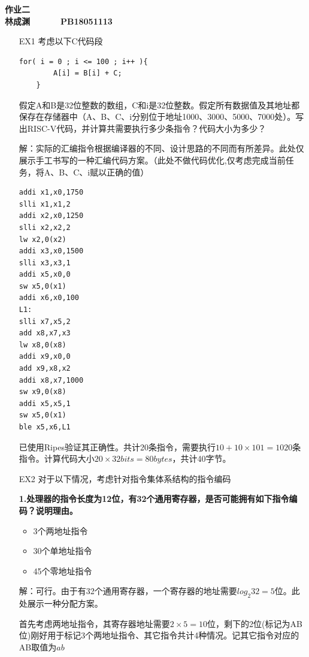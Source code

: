 \documentclass[12pt,a4paper,utf8]{ctexart}
\begin{document}


\begin{center}
\textbf{作业二}\\
\textbf{林成渊 ~~~~~ PB18051113 ~~~~~ \zhtoday}\\
\end{center}
\textit{}
\vspace{\baselineskip}

\begin{enumerate}
\item[EX1] %
考虑以下C代码段
\begin{lstlisting}[frame=single]
	for( i = 0 ; i <= 100 ; i++ ){
		A[i] = B[i] + C;
	}
\end{lstlisting}
假定A和B是32位整数的数组，C和i是32位整数。假定所有数据值及其地址都保存在存储器中（A、B、C、i分别位于地址1000、3000、5000、7000处）。写出RISC-V代码，并计算共需要执行多少条指令？代码大小为多少？

解：实际的汇编指令根据编译器的不同、设计思路的不同而有所差异。此处仅展示手工书写的一种汇编代码方案。（此处不做代码优化,仅考虑完成当前任务，将A、B、C、i赋以正确的值）
\begin{lstlisting}[frame=single]
addi x1,x0,1750
slli x1,x1,2
addi x2,x0,1250
slli x2,x2,2
lw x2,0(x2)
addi x3,x0,1500
slli x3,x3,1
addi x5,x0,0
sw x5,0(x1)
addi x6,x0,100
L1:
slli x7,x5,2
add x8,x7,x3
lw x8,0(x8)
addi x9,x0,0
add x9,x8,x2
addi x8,x7,1000
sw x9,0(x8)
addi x5,x5,1
sw x5,0(x1)
ble x5,x6,L1
\end{lstlisting}
已使用Ripes验证其正确性。共计20条指令，需要执行$ 10+10\times 101 = 1020 $条指令。计算代码大小$ 20 \times 32 bits = 80 bytes$，共计40字节。

\item[EX2] %
对于以下情况，考虑针对指令集体系结构的指令编码

\textbf{1.处理器的指令长度为12位，有32个通用寄存器，是否可能拥有如下指令编码？说明理由。}
\begin{itemize}
	\item 3个两地址指令
	\item 30个单地址指令
	\item 45个零地址指令
\end{itemize}

解：可行。由于有32个通用寄存器，一个寄存器的地址需要$ log_2 32 = 5 $位。此处展示一种分配方案。

首先考虑两地址指令，其寄存器地址需要$ 2 \times 5 = 10 $位，剩下的2位(标记为AB位)刚好用于标记3个两地址指令、其它指令共计4种情况。记其它指令对应的AB取值为$ ab $


\end{enumerate}
\end{document}
